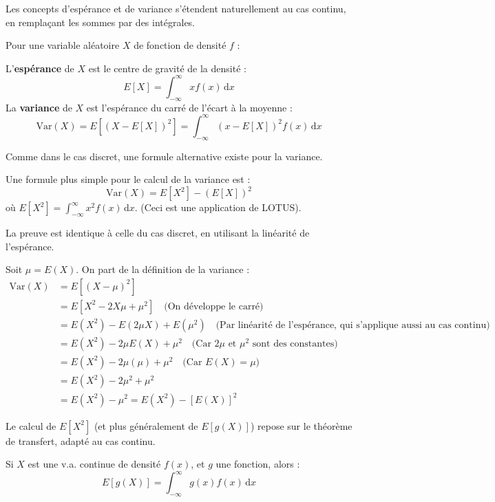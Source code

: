 Les concepts d'espérance et de variance s'étendent naturellement au cas continu, en remplaçant les sommes par des intégrales.

\begin{definitionbox}
Pour une variable aléatoire $X$ de fonction de densité $f$ :

L'\textbf{espérance} de $X$ est le centre de gravité de la densité :
$$ E[X] = \int_{-\infty}^{\infty} x f(x) \, \mathrm{d}x $$
La \textbf{variance} de $X$ est l'espérance du carré de l'écart à la moyenne :
$$ \text{Var}(X) = E[(X - E[X])^2] = \int_{-\infty}^{\infty} (x - E[X])^2 f(x) \, \mathrm{d}x $$
\end{definitionbox}

Comme dans le cas discret, une formule alternative existe pour la variance.

\begin{theorembox}
Une formule plus simple pour le calcul de la variance est :
$$ \text{Var}(X) = E[X^2] - (E[X])^2 $$
où $E[X^2] = \int_{-\infty}^{\infty} x^2 f(x) \, \mathrm{d}x$. (Ceci est une application de LOTUS).
\end{theorembox}

La preuve est identique à celle du cas discret, en utilisant la linéarité de l'espérance.

\begin{proofbox}
Soit $\mu = E(X)$. On part de la définition de la variance :
\begin{align*}
\text{Var}(X) &= E[ (X - \mu)^2 ] \\
&= E[ X^2 - 2X\mu + \mu^2 ] \quad \text{(On développe le carré)} \\
&= E(X^2) - E(2\mu X) + E(\mu^2) \quad \text{(Par linéarité de l'espérance, qui s'applique aussi au cas continu)} \\
&= E(X^2) - 2\mu E(X) + \mu^2 \quad \text{(Car $2\mu$ et $\mu^2$ sont des constantes)} \\
&= E(X^2) - 2\mu(\mu) + \mu^2 \quad \text{(Car $E(X) = \mu$)} \\
&= E(X^2) - 2\mu^2 + \mu^2 \\
&= E(X^2) - \mu^2 = E(X^2) - [E(X)]^2
\end{align*}
\end{proofbox}

Le calcul de $E[X^2]$ (et plus généralement de $E[g(X)]$) repose sur le théorème de transfert, adapté au cas continu.

\begin{theorembox}
Si $X$ est une v.a. continue de densité $f(x)$, et $g$ une fonction, alors :
$$ E[g(X)] = \int_{-\infty}^{\infty} g(x) f(x) \, \mathrm{d}x $$
\end{theorembox}

